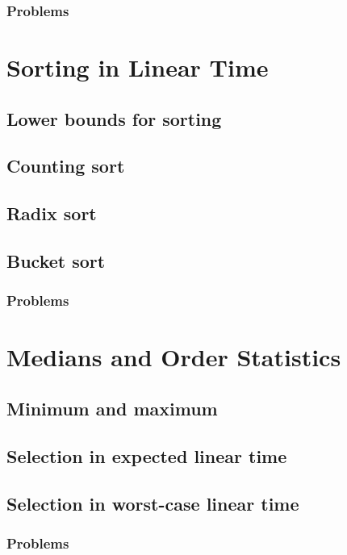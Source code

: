 \documentclass[fontsize=12pt,paper=a4,open=any]{book}
\begin{document}
\subsection*{Problems}


\chapter{Sorting in Linear Time}

\section{Lower bounds for sorting}

\section{Counting sort}

\section{Radix sort}

\section{Bucket sort}

\subsection*{Problems}


\chapter{Medians and Order Statistics}

\section{Minimum and maximum}

\section{Selection in expected linear time}

\section{Selection in worst-case linear time}

\subsection*{Problems}
\end{document}

